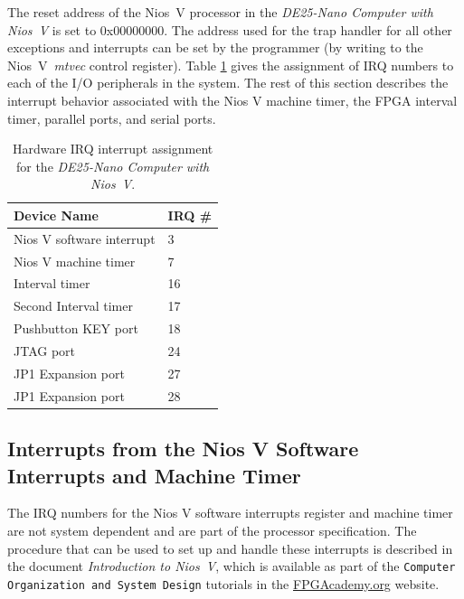 \documentclass[11pt, twoside, pdftex]{article}
\newcommand{\commonFiles}{../../../common/doc}
\newcommand{\systemNameFull}{DE25-Nano Computer with Nios~V}
\newcommand{\processor}{Nios~V}
\begin{document}
The reset address of the {\processor} processor in the {\it \systemNameFull} is set to
{\sf 0x00000000}. The address used for the trap handler for all other exceptions and 
interrupts can be set by the programmer (by writing to the \processor~{\it mtvec} 
control register). 
Table \ref{tab:irq} gives the assignment of IRQ numbers to each of the I/O peripherals in 
the system. The rest of this section describes the interrupt behavior associated 
with the Nios V machine timer, the FPGA interval timer, parallel ports, and serial ports.

\begin{table}[h]
    \begin{center}
    \begin{tabular}{l|l}
            \textbf{Device Name} &
            \textbf{IRQ \#}
        \\\hline
            Nios V software interrupt & 3 \\
            Nios V machine timer & 7 \\
            Interval timer & 16 \\
            Second Interval timer & 17 \\
            Pushbutton KEY port & 18 \\
            JTAG port & 24 \\
            JP1 Expansion port & 27 \\
            JP1 Expansion port & 28 \\
    \end{tabular}
    \caption{Hardware IRQ interrupt assignment for the {\it \systemNameFull}.}
	 \label{tab:irq}
    \end{center}
\end{table}

\subsection{Interrupts from the Nios V Software Interrupts and Machine Timer}
The IRQ numbers for the Nios V software interrupts register and machine timer are not
system dependent and are part of the processor specification. The procedure that can be used
to set up and handle these interrupts is described in the 
document {\it Introduction to \processor}, which is available as part of the 
\texttt{Computer Organization and System Design} tutorials in the 
{\small \href{https://www.fpgacademy.org/tutorials.html} {FPGAcademy.org}} website.





\end{document}

